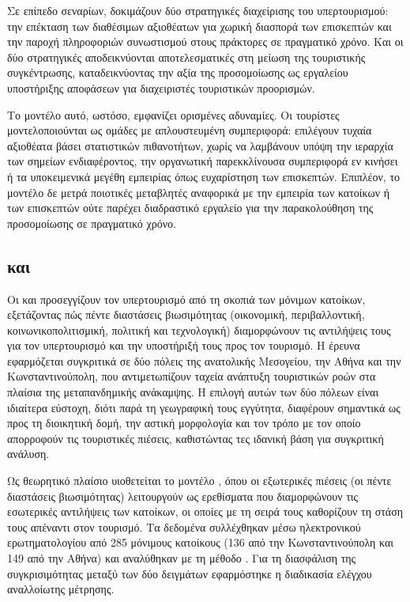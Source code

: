 Σε επίπεδο σεναρίων, δοκιμάζουν δύο στρατηγικές διαχείρισης
του υπερτουρισμού: την επέκταση των διαθέσιμων αξιοθέατων για χωρική
διασπορά των επισκεπτών και την παροχή πληροφοριών συνωστισμού στους
πράκτορες σε πραγματικό χρόνο. Και οι δύο στρατηγικές αποδεικνύονται
αποτελεσματικές στη μείωση της τουριστικής συγκέντρωσης,
καταδεικνύοντας την αξία της προσομοίωσης  ως εργαλείου
υποστήριξης αποφάσεων για διαχειριστές τουριστικών προορισμών.

Το μοντέλο αυτό, ωστόσο, εμφανίζει ορισμένες αδυναμίες. Οι τουρίστες
μοντελοποιούνται ως ομάδες με απλουστευμένη συμπεριφορά: επιλέγουν
τυχαία αξιοθέατα βάσει στατιστικών πιθανοτήτων, χωρίς να λαμβάνουν
υπόψη την ιεραρχία των σημείων ενδιαφέροντος, την οργανωτική
παρεκκλίνουσα συμπεριφορά εν κινήσει ή τα υποκειμενικά μεγέθη
εμπειρίας όπως ευχαρίστηση των επισκεπτών. Επιπλέον, το μοντέλο δε
μετρά ποιοτικές μεταβλητές αναφορικά με την εμπειρία των κατοίκων ή
των επισκεπτών ούτε παρέχει διαδραστικό εργαλείο για την
παρακολούθηση της προσομοίωσης σε πραγματικό χρόνο.

\subsection{ και }

Οι  και  \cite{yaprak2025reframing}
προσεγγίζουν τον υπερτουρισμό από τη σκοπιά των μόνιμων κατοίκων,
εξετάζοντας πώς πέντε διαστάσεις βιωσιμότητας (οικονομική, περιβαλλοντική,
κοινωνικοπολιτισμική, πολιτική και τεχνολογική) διαμορφώνουν τις
αντιλήψεις τους για τον υπερτουρισμό και την υποστήριξή τους προς τον
τουρισμό. Η έρευνα εφαρμόζεται συγκριτικά σε δύο πόλεις της ανατολικής
Μεσογείου, την Αθήνα και την Κωνσταντινούπολη, που αντιμετωπίζουν ταχεία
ανάπτυξη τουριστικών ροών στα πλαίσια της μεταπανδημικής ανάκαμψης.
Η επιλογή αυτών των δύο πόλεων είναι ιδιαίτερα εύστοχη, διότι παρά τη
γεωγραφική τους εγγύτητα, διαφέρουν σημαντικά ως προς τη διοικητική δομή,
την αστική μορφολογία και τον τρόπο με τον οποίο απορροφούν τις
τουριστικές πιέσεις, καθιστώντας τες ιδανική βάση για συγκριτική ανάλυση.

Ως θεωρητικό πλαίσιο υιοθετείται το μοντέλο , όπου οι εξωτερικές πιέσεις  (οι πέντε διαστάσεις βιωσιμότητας)
λειτουργούν ως ερεθίσματα που διαμορφώνουν τις εσωτερικές αντιλήψεις των
κατοίκων, οι οποίες με τη σειρά τους καθορίζουν τη στάση τους απέναντι
στον τουρισμό. Τα δεδομένα συλλέχθηκαν μέσω ηλεκτρονικού ερωτηματολογίου
από 285 μόνιμους κατοίκους (136 από την Κωνσταντινούπολη και 149 από την
Αθήνα) και αναλύθηκαν με τη μέθοδο . Για τη διασφάλιση της
συγκρισιμότητας μεταξύ των δύο δειγμάτων εφαρμόστηκε η διαδικασία
 ελέγχου αναλλοίωτης μέτρησης.

